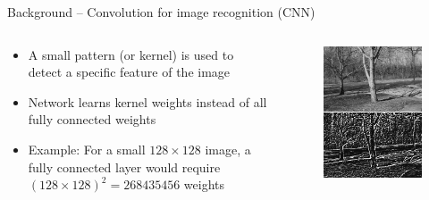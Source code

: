 \documentclass{beamer}
\begin{document}
	\begin{frame}{Background -- Convolution for image recognition (CNN)}
	\begin{columns}
	\begin{column}{0.75\textwidth}
	\begin{itemize}
		\item A small pattern (or kernel) is used to detect a specific feature of the image
		\item Network learns kernel weights instead of all fully connected weights
		\item Example: For a small $128 \times 128$ image, a fully connected layer would require $(128 \times 128)^2 = 268435456$ weights
	\end{itemize}
	\end{column}
	\begin{column}{0.25\textwidth}
	\begin{figure}
		\includegraphics[width=\textwidth]{kernel}
	\end{figure}

\end{column}
\end{columns}
\end{frame}
\end{document}
